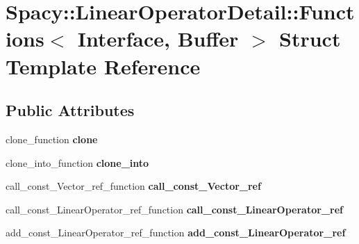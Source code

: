\hypertarget{structSpacy_1_1LinearOperatorDetail_1_1Functions}{\section{\-Spacy\-:\-:\-Linear\-Operator\-Detail\-:\-:\-Functions$<$ \-Interface, \-Buffer $>$ \-Struct \-Template \-Reference}
\label{structSpacy_1_1LinearOperatorDetail_1_1Functions}
}
\subsection*{\-Public \-Attributes}
\begin{DoxyCompactItemize}
\item 
\hypertarget{structSpacy_1_1LinearOperatorDetail_1_1Functions_a73e1c63f52c0fcea4230bd42c1c8e871}{clone\-\_\-function {\bfseries clone}}\label{structSpacy_1_1LinearOperatorDetail_1_1Functions_a73e1c63f52c0fcea4230bd42c1c8e871}

\item 
\hypertarget{structSpacy_1_1LinearOperatorDetail_1_1Functions_a98dd87e71d36475e5c240d5a16133090}{clone\-\_\-into\-\_\-function {\bfseries clone\-\_\-into}}\label{structSpacy_1_1LinearOperatorDetail_1_1Functions_a98dd87e71d36475e5c240d5a16133090}

\item 
\hypertarget{structSpacy_1_1LinearOperatorDetail_1_1Functions_ad722f01b5a3a70cea92a99007b43dff4}{call\-\_\-const\-\_\-\-Vector\-\_\-ref\-\_\-function {\bfseries call\-\_\-const\-\_\-\-Vector\-\_\-ref}}\label{structSpacy_1_1LinearOperatorDetail_1_1Functions_ad722f01b5a3a70cea92a99007b43dff4}

\item 
\hypertarget{structSpacy_1_1LinearOperatorDetail_1_1Functions_adee6bec671dc5fa54f2573a38d344024}{call\-\_\-const\-\_\-\-Linear\-Operator\-\_\-ref\-\_\-function {\bfseries call\-\_\-const\-\_\-\-Linear\-Operator\-\_\-ref}}\label{structSpacy_1_1LinearOperatorDetail_1_1Functions_adee6bec671dc5fa54f2573a38d344024}

\item 
\hypertarget{structSpacy_1_1LinearOperatorDetail_1_1Functions_a0db6f6e5c8165f1308c6f58c82892e0b}{add\-\_\-const\-\_\-\-Linear\-Operator\-\_\-ref\-\_\-function {\bfseries add\-\_\-const\-\_\-\-Linear\-Operator\-\_\-ref}}\label{structSpacy_1_1LinearOperatorDetail_1_1Functions_a0db6f6e5c8165f1308c6f58c82892e0b}


\end{DoxyCompactItemize}
